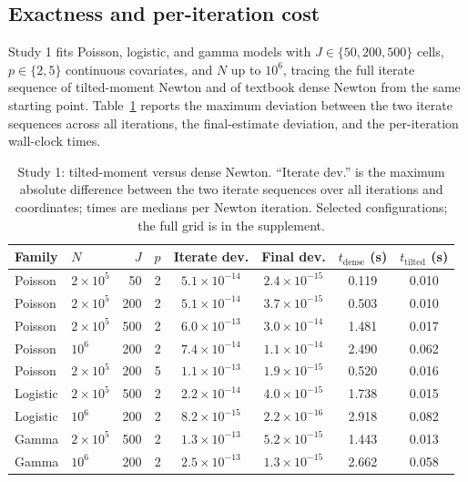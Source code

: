 \documentclass[11pt]{article}
\begin{document}
\subsection{Exactness and per-iteration cost}
\label{sec:sim-validation}

Study 1 fits Poisson, logistic, and gamma models with $J \in \{50, 200,
500\}$ cells, $p \in \{2, 5\}$ continuous covariates, and $N$ up to
$10^6$, tracing the full iterate sequence of tilted-moment Newton and of
textbook dense Newton from the same starting point.
Table~\ref{tab:sim1} reports the maximum deviation between the two
iterate sequences across all iterations, the final-estimate deviation,
and the per-iteration wall-clock times.

\begin{table}[t]
\centering
\caption{Study 1: tilted-moment versus dense Newton.  ``Iterate dev.''
is the maximum absolute difference between the two iterate sequences over
all iterations and coordinates; times are medians per Newton iteration.
Selected configurations; the full grid is in the supplement.}
\label{tab:sim1}
\small
\begin{tabular}{llrrcccc}
\toprule
Family & $N$ & $J$ & $p$ & Iterate dev. & Final dev. &
$t_{\mathrm{dense}}$ (s) & $t_{\mathrm{tilted}}$ (s) \\
\midrule
Poisson  & $2\times10^5$ & 50  & 2 & $5.1\times10^{-14}$ & $2.4\times10^{-15}$ & 0.119 & 0.010 \\
Poisson  & $2\times10^5$ & 200 & 2 & $5.1\times10^{-14}$ & $3.7\times10^{-15}$ & 0.503 & 0.010 \\
Poisson  & $2\times10^5$ & 500 & 2 & $6.0\times10^{-13}$ & $3.0\times10^{-14}$ & 1.481 & 0.017 \\
Poisson  & $10^6$        & 200 & 2 & $7.4\times10^{-14}$ & $1.1\times10^{-14}$ & 2.490 & 0.062 \\
Poisson  & $2\times10^5$ & 200 & 5 & $1.1\times10^{-13}$ & $1.9\times10^{-15}$ & 0.520 & 0.016 \\
Logistic & $2\times10^5$ & 500 & 2 & $2.2\times10^{-14}$ & $4.0\times10^{-15}$ & 1.738 & 0.015 \\
Logistic & $10^6$        & 200 & 2 & $8.2\times10^{-15}$ & $2.2\times10^{-16}$ & 2.918 & 0.082 \\
Gamma    & $2\times10^5$ & 500 & 2 & $1.3\times10^{-13}$ & $5.2\times10^{-15}$ & 1.443 & 0.013 \\
Gamma    & $10^6$        & 200 & 2 & $2.5\times10^{-13}$ & $1.3\times10^{-15}$ & 2.662 & 0.058 \\
\bottomrule
\end{tabular}
\end{table}
\end{document}
